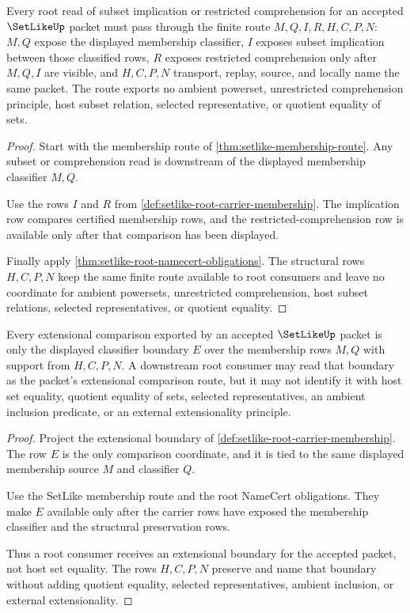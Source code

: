 \begin{theorem}\label{thm:setlike-subset-comprehension-root-unblock}
Every root read of subset implication or restricted comprehension for an accepted $\SetLikeUp$ packet must pass through the finite route $M,Q,I,R,H,C,P,N$: $M,Q$ expose the displayed membership classifier, $I$ exposes subset implication between those classified rows, $R$ exposes restricted comprehension only after $M,Q,I$ are visible, and $H,C,P,N$ transport, replay, source, and locally name the same packet. The route exports no ambient powerset, unrestricted comprehension principle, host subset relation, selected representative, or quotient equality of sets.
\end{theorem}
\begin{proof}
Start with the membership route of \autoref{thm:setlike-membership-route}. Any subset or comprehension read is downstream of the displayed membership classifier $M,Q$.

Use the rows $I$ and $R$ from \autoref{def:setlike-root-carrier-membership}. The implication row compares certified membership rows, and the restricted-comprehension row is available only after that comparison has been displayed.

Finally apply \autoref{thm:setlike-root-namecert-obligations}. The structural rows $H,C,P,N$ keep the same finite route available to root consumers and leave no coordinate for ambient powersets, unrestricted comprehension, host subset relations, selected representatives, or quotient equality.
\end{proof}

\begin{theorem}\label{thm:setlike-extensionality-root-unblock}
Every extensional comparison exported by an accepted $\SetLikeUp$ packet is only the displayed classifier boundary $E$ over the membership rows $M,Q$ with support from $H,C,P,N$. A downstream root consumer may read that boundary as the packet's extensional comparison route, but it may not identify it with host set equality, quotient equality of sets, selected representatives, an ambient inclusion predicate, or an external extensionality principle.
\end{theorem}
\begin{proof}
Project the extensional boundary of \autoref{def:setlike-root-carrier-membership}. The row $E$ is the only comparison coordinate, and it is tied to the same displayed membership source $M$ and classifier $Q$.

Use the SetLike membership route and the root NameCert obligations. They make $E$ available only after the carrier rows have exposed the membership classifier and the structural preservation rows.

Thus a root consumer receives an extensional boundary for the accepted packet, not host set equality. The rows $H,C,P,N$ preserve and name that boundary without adding quotient equality, selected representatives, ambient inclusion, or external extensionality.
\end{proof}


